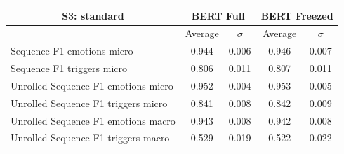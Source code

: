 \documentclass[11pt,table,xcdraw]{article}
\begin{document}
\begin{table}[h]
\bigskip
\begin{tabular}{|l|cc|cc|}
\hline
\multicolumn{1}{|c|}{\textbf{S3: standard}}              & \multicolumn{2}{c|}{BERT Full}                                                     & \multicolumn{2}{c|}{BERT Freezed}                                                  \\ \hline
\multicolumn{1}{|c|}{}              & \multicolumn{1}{c|}{Average}                       & $\sigma$                         & \multicolumn{1}{c|}{Average}                       & $\sigma$                         \\ \hline
Sequence F1 emotions micro          & \multicolumn{1}{c|}{\cellcolor[HTML]{009901}0.944} & \cellcolor[HTML]{FFFFFF}0.006 & \multicolumn{1}{c|}{\cellcolor[HTML]{009901}0.946} & \cellcolor[HTML]{FFFFFF}0.007 \\ \hline
Sequence F1 triggers micro          & \multicolumn{1}{c|}{\cellcolor[HTML]{32CB00}0.806} & \cellcolor[HTML]{FFFFFF}0.011 & \multicolumn{1}{c|}{\cellcolor[HTML]{32CB00}0.807} & \cellcolor[HTML]{FFFFFF}0.011 \\ \hline
Unrolled Sequence F1 emotions micro & \multicolumn{1}{c|}{\cellcolor[HTML]{009901}0.952} & \cellcolor[HTML]{FFFFFF}0.004 & \multicolumn{1}{c|}{\cellcolor[HTML]{009901}0.953} & \cellcolor[HTML]{FFFFFF}0.005 \\ \hline
Unrolled Sequence F1 triggers micro & \multicolumn{1}{c|}{\cellcolor[HTML]{32CB00}0.841} & \cellcolor[HTML]{FFFFFF}0.008 & \multicolumn{1}{c|}{\cellcolor[HTML]{32CB00}0.842} & \cellcolor[HTML]{FFFFFF}0.009 \\ \hline
Unrolled Sequence F1 emotions macro & \multicolumn{1}{c|}{\cellcolor[HTML]{009901}0.943} & \cellcolor[HTML]{FFFFFF}0.008 & \multicolumn{1}{c|}{\cellcolor[HTML]{009901}0.942} & \cellcolor[HTML]{FFFFFF}0.008 \\ \hline
Unrolled Sequence F1 triggers macro & \multicolumn{1}{c|}{\cellcolor[HTML]{F8A102}0.529} & \cellcolor[HTML]{FFFFFF}0.019 & \multicolumn{1}{c|}{\cellcolor[HTML]{F8A102}0.522} & \cellcolor[HTML]{FFFFFF}0.022 \\ \hline
\end{tabular}


\end{table}
\end{document}
